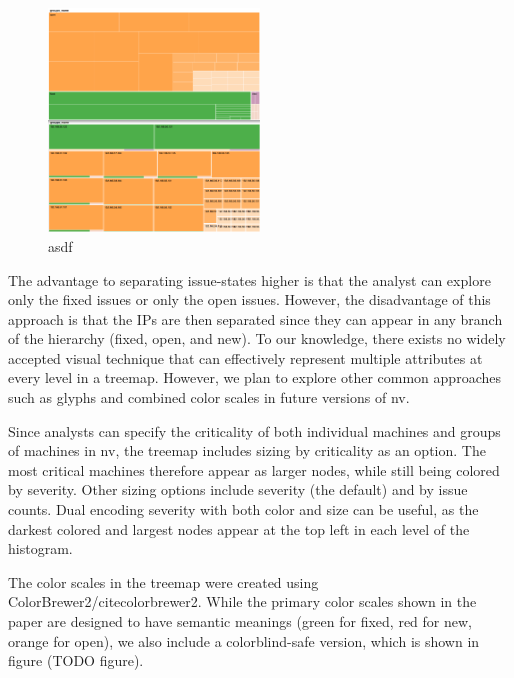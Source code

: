 \documentclass{acm_proc_article-sp}
\begin{document}
\begin{figure}
  \centering
  \includegraphics[width=0.5\textwidth]{../screenshots/state_issue}
  \caption{asdf}
\end{figure}

The advantage to separating issue-states higher is that the analyst can explore only the fixed issues or only the open issues.
However, the disadvantage of this approach is that the IPs are then separated since they can appear in any branch of the hierarchy (fixed, open, and new).
To our knowledge, there exists no widely accepted visual technique that can effectively represent multiple attributes at every level in a treemap.
However, we plan to explore other common approaches such as glyphs and combined color scales in future versions of nv.


Since analysts can specify the criticality of both individual machines and groups of machines in nv, the treemap includes sizing by criticality as an option.
The most critical machines therefore appear as larger nodes, while still being colored by severity.
Other sizing options include severity (the default) and by issue counts.
Dual encoding severity with both color and size can be useful, as the darkest colored and largest nodes appear at the top left in each level of the histogram.

The color scales in the treemap were created using ColorBrewer2/cite{colorbrewer2}.
While the primary color scales shown in the paper are designed to have semantic meanings (green for fixed, red for new, orange for open), we also include a colorblind-safe version, which is shown in figure (TODO figure).
\end{document}
